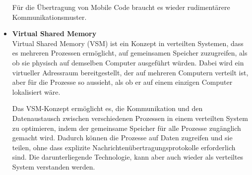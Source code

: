 \documentclass[../vs-script-first-v01.tex]{subfiles}
\begin{document}
\begin{itemize}
Für die Übertragung von Mobile Code braucht es wieder rudimentärere Kommunikationsmuster. 
\item \textbf{Virtual Shared Memory} \\
Virtual Shared Memory (VSM) ist ein Konzept in verteilten Systemen, dass es mehreren Prozessen ermöglicht, auf gemeinsamen Speicher zuzugreifen, als ob sie physisch auf demselben Computer ausgeführt würden. Dabei wird ein virtueller Adressraum bereitgestellt, der auf mehreren Computern verteilt ist, aber für die Prozesse so aussieht, als ob er auf einem einzigen Computer lokalisiert wäre.

Das VSM-Konzept ermöglicht es, die Kommunikation und den Datenaustausch zwischen verschiedenen Prozessen in einem verteilten System zu optimieren, indem der gemeinsame Speicher für alle Prozesse zugänglich gemacht wird. Dadurch können die Prozesse auf Daten zugreifen und sie teilen, ohne dass explizite Nachrichtenübertragungsprotokolle erforderlich sind.
Die darunterliegende Technologie, kann aber auch wieder als verteiltes System verstanden werden.
\end{itemize}
\end{document}

